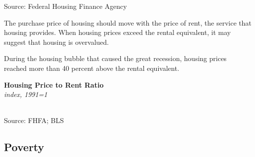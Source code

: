 \documentclass{report}
\makeatletter
\newcommand{\tbllink}[1]{\href{https://raw.githubusercontent.com/bdecon/US-chartbook/master/chartbook/data/#1}{\faTable}}
\newcommand*\short[1]{\expandafter\@gobbletwo\number\numexpr#1\relax}
\newcommand{\shdateaxisticks}{
		date coordinates in=x, axis line style={draw=none},
		xmax={2022-01-30},
		max space between ticks=40,	    
		xtick={{1990-01-01}, {1995-01-01}, {2000-01-01}, 
			{2005-01-01}, {2010-01-01}, {2015-01-01}, {2020-01-01}},
		minor xtick={},
		enlarge y limits={0.06}, enlarge x limits={0.01},
		}
\newcommand{\stdline}[4]{\addplot[very thick, no markers, color=#1] 
		table [x=#2, y=#3, col sep=comma] {#4};	}
\newcommand{\rebars}{
		\fill[color=black!10] (axis cs:{2007-12-01},\pgfkeysvalueof{/pgfplots/ymin}) rectangle 
			(axis cs:{2009-07-01}, \pgfkeysvalueof{/pgfplots/ymax});
		\fill[color=black!10] (axis cs:{2001-03-01},\pgfkeysvalueof{/pgfplots/ymin}) rectangle 
			(axis cs:{2001-11-01}, \pgfkeysvalueof{/pgfplots/ymax});
		\fill[color=black!10] (axis cs:{2020-02-01},\pgfkeysvalueof{/pgfplots/ymin}) rectangle 
			(axis cs:{2020-05-01}, \pgfkeysvalueof{/pgfplots/ymax});}
\makeatother
\begin{document}
{\begin{minipage}{0.76\textwidth}
	\vspace{-2mm}
\footnotesize{Source: Federal Housing Finance Agency} \hfill \tbllink{hpi.csv}
\end{minipage}
\vspace{6mm}

\begin{minipage}{0.33\textwidth}
\small The purchase price of housing should move with the price of rent, the service that housing provides. When housing prices exceed the rental equivalent, it may suggest that housing is overvalued. 

During the housing bubble that caused the great recession, housing prices reached more than 40 percent above the rental equivalent. 
\end{minipage}\hspace{8mm}
\begin{minipage}{0.37\textwidth}
\normalsize \textbf{Housing Price to Rent Ratio}\\
\footnotesize{\textit{index, 1991=1}}\\
\hspace*{-2mm} \\
\footnotesize{Source: FHFA; BLS} \hfill \tbllink{hpi_rent_ratio.csv} 

\end{minipage}
\newpage
\subsection*{\color{black!70} \seriffont Poverty}
\begin{minipage}{0.76\textwidth}
\small 


\end{minipage}}
\end{document}
